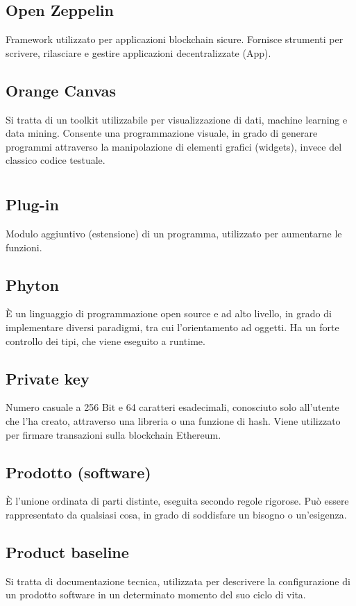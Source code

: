 	\subsection*{Open Zeppelin}
	Framework utilizzato per applicazioni blockchain sicure. Fornisce strumenti per scrivere, rilasciare e gestire applicazioni decentralizzate (\DJ{}App).
	\subsection*{Orange Canvas}
	Si tratta di un toolkit utilizzabile per visualizzazione di dati, machine learning e data mining. Consente una programmazione visuale, in grado di generare programmi attraverso la manipolazione di elementi grafici (widgets), invece del classico codice testuale.
\pagebreak
\section{}
	\subsection*{Plug-in}
	Modulo aggiuntivo (estensione) di un programma, utilizzato per aumentarne le funzioni.
	\subsection*{Phyton}
	È un linguaggio di programmazione open source e ad alto livello, in grado di implementare diversi paradigmi, tra cui l’orientamento ad oggetti. Ha un forte controllo dei tipi, che viene eseguito a runtime.
	\subsection*{Private key}
	Numero casuale a 256 Bit e 64 caratteri esadecimali, conosciuto solo all’utente che l’ha creato, attraverso una libreria o una funzione di hash. Viene utilizzato per firmare transazioni sulla blockchain Ethereum.
	\subsection*{Prodotto (software)}
	È l’unione ordinata di parti distinte, eseguita secondo regole rigorose. Può essere rappresentato da qualsiasi cosa, in grado di soddisfare un bisogno o un’esigenza.
	\subsection*{Product baseline}
	Si tratta di documentazione tecnica, utilizzata per descrivere la configurazione di un prodotto software in un determinato momento del suo ciclo di vita.
